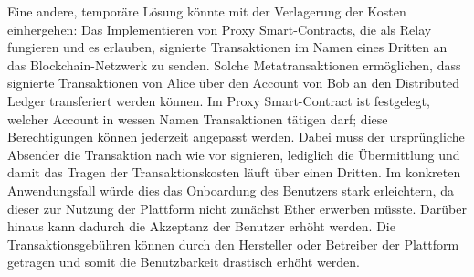 Eine andere, temporäre Lösung könnte mit der Verlagerung der Kosten einhergehen: Das Implementieren von Proxy Smart-Contracts, die als Relay fungieren und es erlauben, signierte Transaktionen im Namen eines Dritten an das Blockchain-Netzwerk zu senden. Solche Metatransaktionen ermöglichen, dass signierte Transaktionen von Alice über den Account von Bob an den Distributed Ledger transferiert werden können. Im Proxy Smart-Contract ist festgelegt, welcher Account in wessen Namen Transaktionen tätigen darf; diese Berechtigungen können jederzeit angepasst werden. Dabei muss der ursprüngliche Absender die Transaktion nach wie vor signieren, lediglich die Übermittlung und damit das Tragen der Transaktionskosten läuft über einen Dritten. Im konkreten Anwendungsfall würde dies das Onboardung des Benutzers stark erleichtern, da dieser zur Nutzung der Plattform nicht zunächst Ether erwerben müsste. Darüber hinaus kann dadurch die Akzeptanz der Benutzer erhöht werden. Die Transaktionsgebühren können durch den Hersteller oder Betreiber der Plattform getragen und somit die Benutzbarkeit drastisch erhöht werden.

